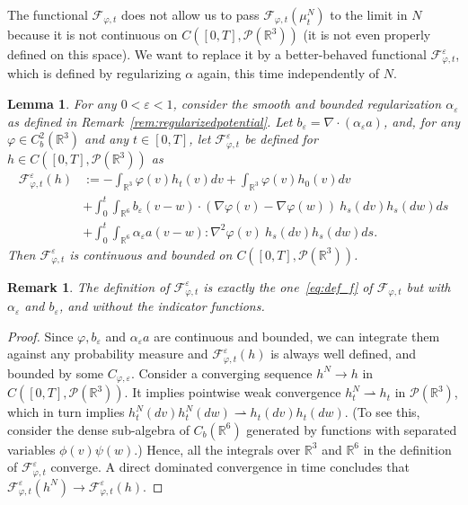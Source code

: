 \documentclass[11pt,a4paper]{article}
\theoremstyle{definition}
\theoremstyle{plain}
\newtheorem{lemma}[defi]{Lemma}
\newtheorem{remark}[defi]{Remark}
\begin{document}
The functional $\mathcal{F}_{\varphi,t}$ does not allow us to pass $\mathcal{F}_{\varphi,t}(\mu^N_t)$ to the limit in $N$ because it is not continuous on $C([0,T],\mathcal{P}(\mathbb{R}^3))$ (it is not even properly defined on this space). We want to replace it by a better-behaved functional $\mathcal{F}^\varepsilon_{\varphi,t}$, which is defined by regularizing $\alpha$ again, this time independently of $N$.
\begin{lemma}
    \label{aswsolution-fepsilon}
    For any $0<\varepsilon<1$, consider the smooth and bounded regularization $\alpha_\varepsilon$ as defined in Remark~\ref{rem:regularizedpotential}. Let $b_\varepsilon=\nabla\cdot(\alpha_\varepsilon a)$, and, for any $\varphi\in C^2_b(\mathbb{R}^3)$ and any $t\in[0,T]$,
    let $\mathcal{F}^\varepsilon_{\varphi,t}$ be defined for $h\in C([0,T],\mathcal{P}(\mathbb{R}^3))$ as
    \begin{align*}
    \mathcal{F}^\varepsilon_{\varphi,t}(h) &:=  -\int_{\mathbb{R}^3} \varphi(v)h_t(v)dv + \int_{\mathbb{R}^3} \varphi(v)h_0(v)dv \nonumber\\
    &+ \int_0^t \int_{\mathbb{R}^6} b_\varepsilon(v-w) \cdot (\nabla\varphi(v)-\nabla\varphi(w))\ h_s(dv)h_s(dw) ds\\
    &+ \int_0^t \int_{\mathbb{R}^6}\alpha_\varepsilon a(v-w):\nabla^2\varphi(v)\ h_s(dv)h_s(dw) ds.\nonumber
    \end{align*}
    Then $\mathcal{F}^\varepsilon_{\varphi,t}$ is continuous and bounded on $C([0,T],\mathcal{P}(\mathbb{R}^3))$.
\end{lemma}
\begin{remark}
    The definition of $\mathcal{F}^\varepsilon_{\varphi,t}$ is exactly the one~\eqref{eq:def_f} of $\mathcal{F}_{\varphi,t}$ but with $\alpha_\varepsilon$ and $b_\varepsilon$, and without the indicator functions.
\end{remark}
\begin{proof}
    Since $\varphi, b_\varepsilon$ and $\alpha_\varepsilon a$ are continuous and bounded, we can integrate them against any probability measure and $\mathcal{F}^\varepsilon_{\varphi,t}(h)$ is always well defined, and bounded by some $C_{\varphi,\varepsilon}$.
    Consider a converging sequence $h^N \rightarrow h$ in $C([0,T],\mathcal{P}(\mathbb{R}^3))$. It implies pointwise weak convergence $h^N_t\rightharpoonup h_t$ in $\mathcal{P}(\mathbb{R}^3)$, which in turn implies $h^N_t(dv)h^N_t(dw)\rightharpoonup h_t(dv) h_t(dw). $
    (To see this, consider the dense sub-algebra of $C_b(\mathbb{R}^6)$ generated by functions with separated variables $\phi(v)\psi(w)$.) Hence, all the integrals over $\mathbb{R}^3$ and $\mathbb{R}^6$ in the definition of $\mathcal{F}^\varepsilon_{\varphi,t}$ converge. A direct dominated convergence in time concludes that $\mathcal{F}^\varepsilon_{\varphi,t}(h^N)\rightarrow\mathcal{F}^\varepsilon_{\varphi,t}(h)$.
\end{proof}
\end{document}
